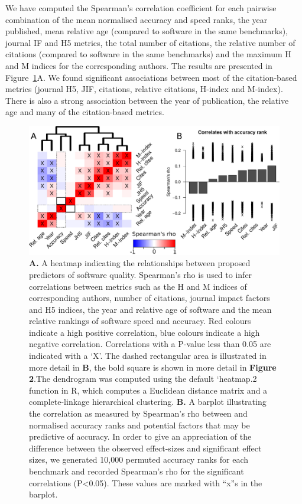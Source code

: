 \documentclass[fleqn,10pt]{SelfArx} %
\begin{document}
We have computed the Spearman’s correlation coefficient for each pairwise combination of the mean normalised accuracy and speed ranks, the year published, mean relative age (compared to software in the same benchmarks), journal IF and H5 metrics, the total number of citations, the relative number of citations (compared to software in the same benchmarks) and the maximum H and M indices for the corresponding authors. The results are presented in Figure~\ref{fig:allfactors}A. We found significant associations between most of the citation-based metrics (journal H5, JIF, citations, relative citations, H-index and M-index). There is also a strong association between the year of publication, the relative age and many of the citation-based metrics.

\begin{figure}[h]
\includegraphics[width=\textwidth]{figure1.pdf}
\caption{\textbf{A.} A heatmap indicating the relationships between proposed predictors of software quality. Spearman’s rho is used to infer correlations between metrics such as the H and M indices of corresponding authors, number of citations, journal impact factors and H5 indices, the year and relative age of software and the mean relative rankings of software speed and accuracy. Red colours indicate a high positive correlation, blue colours indicate a high negative correlation. Correlations with a P-value less than 0.05 are indicated with a ‘X’. The dashed rectangular area is illustrated in more detail in \textbf{B}, the bold square is shown in more detail in \textbf{Figure 2}.The dendrogram was computed using the default ‘heatmap.2 function in R, which computes a Euclidean distance matrix and a complete-linkage hierarchical clustering. \textbf{B.} A barplot illustrating the correlation as measured by Spearman’s rho between and normalised accuracy ranks and potential factors that may be predictive of accuracy. In order to give an appreciation of the difference between the observed effect-sizes and significant effect sizes, we generated 10,000 permuted accuracy ranks for each benchmark and recorded Spearman’s rho for the significant correlations (P<0.05). These values are marked with “x”s in the barplot.}
\label{fig:allfactors}
\end{figure}
\end{document}

